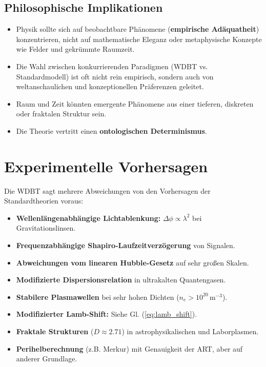 \documentclass[11pt, a4paper]{article}
\begin{document}
\subsection{Philosophische Implikationen}
\label{subsec:philosophie}
\begin{itemize}
    \item Physik sollte sich auf beobachtbare Phänomene (\textbf{empirische Adäquatheit}) konzentrieren, nicht auf mathematische Eleganz oder \glqq metaphysische\grqq{} Konzepte wie Felder und gekrümmte Raumzeit.
    \item Die Wahl zwischen konkurrierenden Paradigmen (WDBT vs. Standardmodell) ist oft nicht rein empirisch, sondern auch von weltanschaulichen und konzeptionellen Präferenzen geleitet.
    \item Raum und Zeit könnten emergente Phänomene aus einer tieferen, diskreten oder fraktalen Struktur sein.
    \item Die Theorie vertritt einen \textbf{ontologischen Determinismus}.
\end{itemize}

\section{Experimentelle Vorhersagen}
\label{sec:vorhersagen}

Die WDBT sagt mehrere Abweichungen von den Vorhersagen der Standardtheorien voraus:
\begin{itemize}
    \item \textbf{Wellenlängenabhängige Lichtablenkung:} $\Delta\phi \propto \lambda^2$ bei Gravitationslinsen.
    \item \textbf{Frequenzabhängige Shapiro-Laufzeitverzögerung} von Signalen.
    \item \textbf{Abweichungen vom linearen Hubble-Gesetz} auf sehr großen Skalen.
    \item \textbf{Modifizierte Dispersionsrelation} in ultrakalten Quantengasen.
    \item \textbf{Stabilere Plasmawellen} bei sehr hohen Dichten ($n_e > 10^{20} \, \text{m}^{-3}$).
    \item \textbf{Modifizierter Lamb-Shift:} Siehe Gl. (\ref{eq:lamb_shift}).
    \item \textbf{Fraktale Strukturen} ($D \approx 2.71$) in astrophysikalischen und Laborplasmen.
    \item \textbf{Perihelberechnung} (z.B. Merkur) mit Genauigkeit der ART, aber auf anderer Grundlage.
\end{itemize}
\end{document}
